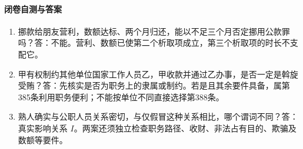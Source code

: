 \paragraph{闭卷自测与答案}
\begin{enumerate}
\item 挪款给朋友营利，数额达标、两个月归还，能以不足三个月否定挪用公款罪吗？答：不能。营利、数额已使第二个析取项成立，第三个析取项的时长不支配它。
\item 甲有权制约其他单位国家工作人员乙，甲收款并通过乙办事，是否一定是斡旋受贿？答：先核实是否为职务上的隶属或制约。若是且其余要件具备，属第385条利用职务便利；不能按单位不同直接选择第388条。
\item 熟人确实与公职人员关系密切，与仅假冒这种关系相比，哪个谓词不同？答：真实影响关系 \(I\)。两案还须独立检查职务路径、收财、非法占有目的、欺骗及数额等要件。
\end{enumerate}
